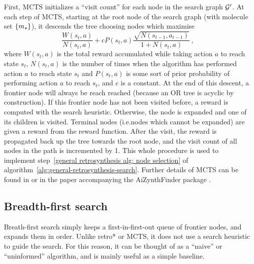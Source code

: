 First, MCTS initializes a ``visit count'' for each node in the search graph ${\mathcal{G}}'$.
At each step of MCTS, starting at the root node of the search graph
(with molecule set $\{m_\star\}$),
it descends the tree choosing nodes which maximise
\begin{equation}
    \frac{W(s_t,a)}{N(s_t,a)} + cP(s_t,a)\frac{\sqrt{N(s_{t-1},a_{t-1})}}{1+N(s_t,a)}\ ,
\end{equation}
where $W(s_t,a)$ is the total reward accumulated while taking action $a$ to reach state
$s_t$, $N(s_t,a)$ is the number of times when the algorithm has performed action $a$
to reach state $s_t$ and $P(s_t,a)$ is some sort of prior probability
of performing action $a$ to reach $s_t$,
and $c$ is a constant.
At the end of this descent, a frontier node will always be reach reached
(because an OR tree is acyclic by construction).
If this frontier node has not been visited before,
a reward is computed with the search heuristic.
Otherwise, the node is expanded and one of its children is visited.
Terminal nodes (i.e.\@ nodes which cannot be expanded) are given a reward from the reward
function.
After the visit, the reward is propagated back up the tree towards the root node,
and the visit count of all nodes in the path is incremented by 1.
This whole procedure is used to implement step~\ref{general retrosynthesis alg: node selection}
of algorithm~\ref{alg:general-retrosynthesis-search}.
Further details of MCTS can be found in \citet{segler2018planning}
or in the paper accompanying the AiZynthFinder package \citep{genheden2020aizynthfinder}.

\subsection{Breadth-first search}

Breath-first search 
simply keeps a first-in-first-out queue of frontier nodes,
and expands them in order.
Unlike retro* or MCTS, it does not use a search heuristic to guide the search.
For this reason, it can be thought of as a ``naive'' or ``uninformed'' algorithm,
and is mainly useful as a simple baseline.

